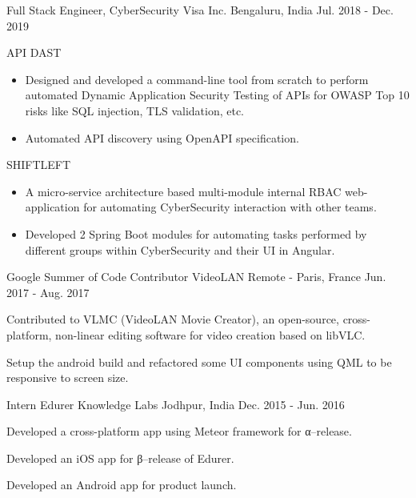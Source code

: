 \begin{cventries}
    \cventry
    {Full Stack Engineer, CyberSecurity} %
    {Visa Inc.} %
    {Bengaluru, India} %
    {Jul. 2018 - Dec. 2019} %
    {
        \begin{cvitems} %
            \item {API DAST}
            \begin{itemize}
                \item {Designed and developed a command-line tool from scratch to perform automated Dynamic Application Security Testing of APIs for OWASP Top 10 risks like SQL injection, TLS validation, etc.}
                \item {Automated API discovery using OpenAPI specification.}
            \end{itemize}
            \item {SHIFTLEFT}
            \begin{itemize}
                \item {A micro-service architecture based multi-module internal RBAC web-application for automating CyberSecurity interaction with other teams.}
                \item {Developed 2 Spring Boot modules for automating tasks performed by different groups within CyberSecurity and their UI in Angular.}
            \end{itemize}
        \end{cvitems}
    }

    \cventry
    {Google Summer of Code Contributor} %
    {VideoLAN} %
    {Remote - Paris, France} %
    {Jun. 2017 - Aug. 2017} %
    {
        \begin{cvitems} %
            \item {Contributed to VLMC (VideoLAN Movie Creator), an open-source, cross-platform, non-linear editing software for video creation based on libVLC.}
            \item {Setup the android build and refactored some UI components using QML to be responsive to screen size.}
        \end{cvitems}
    }

    \cventry
    {Intern} %
    {Edurer Knowledge Labs} %
    {Jodhpur, India} %
    {Dec. 2015 - Jun. 2016} %
    {
        \begin{cvitems} %
            \item {Developed a cross-platform app using Meteor framework for α–release.}
            \item {Developed an iOS app for β–release of Edurer.}
            \item {Developed an Android app for product launch.}
        \end{cvitems}
    }

\end{cventries}
